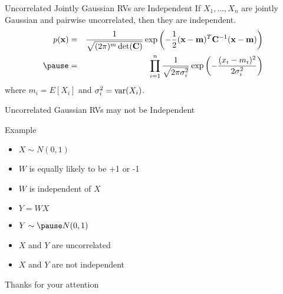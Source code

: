 \documentclass[t]{beamer}
\newcommand{\var}{\operatornamewithlimits{var}}
\begin{document}
\begin{frame}{Uncorrelated Jointly Gaussian RVs are Independent}
  \footnotesize
  \pause
  If $X_1,\ldots,X_n$ are jointly Gaussian and pairwise uncorrelated, then they are independent.
  \begin{eqnarray*}
    p(\mathbf{x}) & = & \frac{1}{\sqrt{(2\pi)^m\det(\mathbf{C})}} \exp\left(-\frac{1}{2} (\mathbf{x}-\mathbf{m})^T\mathbf{C}^{-1}(\mathbf{x}-\mathbf{m})\right) \\
                  \pause
                  & = &  \prod_{i=1}^n \frac{1}{\sqrt{2\pi\sigma_i^2}} \exp\left(-\frac{(x_i-m_i)^2}{2\sigma_i^2}\right)
  \end{eqnarray*}
  where $m_i = E[X_i]$ and $\sigma_i^2 = \var(X_i)$.
  \normalsize
\end{frame}

\begin{frame}{Uncorrelated Gaussian RVs may not be Independent}
  \footnotesize
  \begin{block}{Example}
    \begin{itemize}
      \item $X \sim N(0,1)$
      \pause
      \item $W$ is equally likely to be +1 or -1
      \pause
      \item $W$ is independent of $X$
      \pause
      \item $Y = WX$
      \pause
      \item $Y \sim \pause N(0,1)$
      \pause
      \item $X$ and $Y$ are uncorrelated
      \pause
      \item $X$ and $Y$ are not independent
    \end{itemize}
  \end{block}
  \normalsize
\end{frame}

\begin{frame}{}
\vfill
\begin{center}
Thanks for your attention
\end{center}
\vfill
\end{frame}
\end{document}
